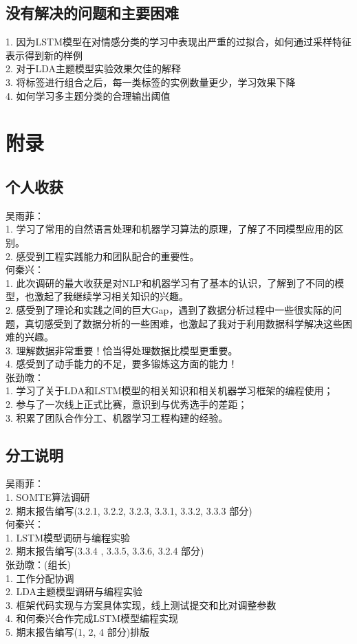 \documentclass[a4paper]{article}
\begin{document}
   	\subsection{没有解决的问题和主要困难}
	\noindent
 	\large
 	1. 因为LSTM模型在对情感分类的学习中表现出严重的过拟合，如何通过采样特征表示得到新的样例 \\
 	2. 对于LDA主题模型实验效果欠佳的解释 \\
 	3. 将标签进行组合之后，每一类标签的实例数量更少，学习效果下降 \\
 	4. 如何学习多主题分类的合理输出阈值 

   \section{附录}
    \subsection{个人收获}
    \noindent
    吴雨菲：\\
    1. 学习了常用的自然语言处理和机器学习算法的原理，了解了不同模型应用的区别。\\
    2. 感受到工程实践能力和团队配合的重要性。\\[10pt]
    何秦兴：\\
    1. 此次调研的最大收获是对NLP和机器学习有了基本的认识，了解到了不同的模型，也激起了我继续学习相关知识的兴趣。  \\
	2. 感受到了理论和实践之间的巨大Gap，遇到了数据分析过程中一些很实际的问题，真切感受到了数据分析的一些困难，也激起了我对于利用数据科学解决这些困难的兴趣。\\
	3. 理解数据非常重要！恰当得处理数据比模型更重要。\\
	4. 感受到了动手能力的不足，要多锻炼这方面的能力！\\[10pt]
    张劲暾：\\
    1. 学习了关于LDA和LSTM模型的相关知识和相关机器学习框架的编程使用； \\
    2. 参与了一次线上正式比赛，意识到与优秀选手的差距；\\
    3. 积累了团队合作分工、机器学习工程构建的经验。
   	\subsection{分工说明}
   	\noindent
 	吴雨菲：\\
 	1. SOMTE算法调研\\
 	2. 期末报告编写(3.2.1, 3.2.2, 3.2.3, 3.3.1, 3.3.2, 3.3.3 部分)\\[10pt]
    何秦兴：\\
    1. LSTM模型调研与编程实验\\
    2. 期末报告编写(3.3.4 , 3.3.5, 3.3.6, 3.2.4 部分)\\[10pt]
    张劲暾：(组长)\\
    1. 工作分配协调\\
    2. LDA主题模型调研与编程实验 \\
    3. 框架代码实现与方案具体实现，线上测试提交和比对调整参数 \\
    4. 和何秦兴合作完成LSTM模型编程实现 \\
    5. 期末报告编写(1, 2, 4 部分)排版 \\
\end{document}
